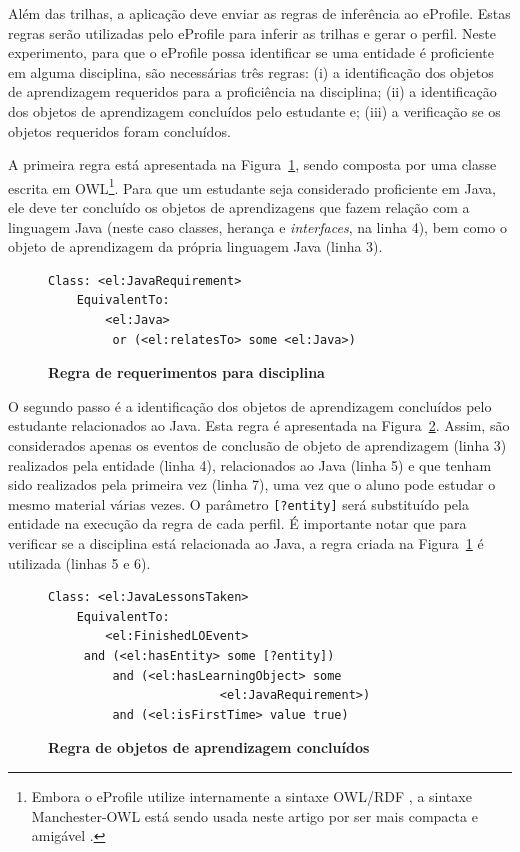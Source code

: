 \documentclass[times, 10pt, twocolumn]{article}
\begin{document}
Além das trilhas, a aplicação deve enviar as regras de inferência ao eProfile. Estas regras serão utilizadas pelo eProfile para inferir as trilhas e gerar o perfil. Neste experimento, para que o eProfile possa identificar se uma entidade é proficiente em alguma disciplina, são necessárias três regras: (i) a identificação dos objetos de aprendizagem requeridos para a proficiência na disciplina; (ii) a identificação dos objetos de aprendizagem concluídos pelo estudante e; (iii) a verificação se os objetos requeridos foram concluídos.

A primeira regra está apresentada na Figura~\ref{cod:regra1}, sendo composta por uma classe escrita em OWL\footnote{Embora o eProfile utilize internamente a sintaxe OWL/RDF \cite{owl-guide}, a sintaxe Manchester-OWL está sendo usada neste artigo por ser mais compacta e amigável \cite{owl-manchester}.}. Para que um estudante seja considerado proficiente em Java, ele deve ter concluído os objetos de aprendizagens que fazem relação com a linguagem Java (neste caso classes, herança e {\em interfaces}, na linha 4), bem como o objeto de aprendizagem da própria linguagem Java (linha 3). 

\begin{figure}
\begin{lstlisting}
Class: <el:JavaRequirement>
    EquivalentTo: 
        <el:Java>
         or (<el:relatesTo> some <el:Java>)
\end{lstlisting}
\caption{\textbf{Regra de requerimentos para disciplina}}
\label{cod:regra1}
\end{figure}

O segundo passo é a identificação dos objetos de aprendizagem concluídos pelo estudante relacionados ao Java. Esta regra é apresentada na Figura~\ref{cod:regra2}. Assim, são considerados apenas os eventos de conclusão de objeto de aprendizagem (linha 3) realizados pela entidade (linha 4), relacionados ao Java (linha 5) e que tenham sido realizados pela primeira vez (linha 7), uma vez que o aluno pode estudar o mesmo material várias vezes. O parâmetro \texttt{[?entity]} será substituído pela entidade na execução da regra de cada perfil. É importante notar que para verificar se a disciplina está relacionada ao Java, a regra criada na Figura~\ref{cod:regra1} é utilizada (linhas 5 e 6).

\begin{figure}
\begin{lstlisting}
Class: <el:JavaLessonsTaken>
    EquivalentTo: 
        <el:FinishedLOEvent>
	 and (<el:hasEntity> some [?entity])
         and (<el:hasLearningObject> some 
	                    <el:JavaRequirement>)
         and (<el:isFirstTime> value true)
\end{lstlisting}
\caption{\textbf{Regra de objetos de aprendizagem concluídos}}
\label{cod:regra2}
\end{figure}
\end{document}
